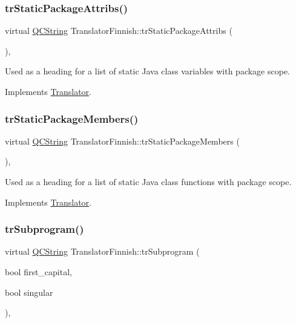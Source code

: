 \subsubsection{\texorpdfstring{trStaticPackageAttribs()}{trStaticPackageAttribs()}}
{\footnotesize\ttfamily virtual \mbox{\hyperlink{class_q_c_string}{Q\+C\+String}} Translator\+Finnish\+::tr\+Static\+Package\+Attribs (\begin{DoxyParamCaption}{ }\end{DoxyParamCaption})\hspace{0.3cm}{\ttfamily [inline]}, {\ttfamily [virtual]}}

Used as a heading for a list of static Java class variables with package scope. 

Implements \mbox{\hyperlink{class_translator}{Translator}}.

\mbox{\label{class_translator_finnish_ac1c0f0f0b111bd2fba917482182455e8}} 
\subsubsection{\texorpdfstring{trStaticPackageMembers()}{trStaticPackageMembers()}}
{\footnotesize\ttfamily virtual \mbox{\hyperlink{class_q_c_string}{Q\+C\+String}} Translator\+Finnish\+::tr\+Static\+Package\+Members (\begin{DoxyParamCaption}{ }\end{DoxyParamCaption})\hspace{0.3cm}{\ttfamily [inline]}, {\ttfamily [virtual]}}

Used as a heading for a list of static Java class functions with package scope. 

Implements \mbox{\hyperlink{class_translator}{Translator}}.

\mbox{\label{class_translator_finnish_a20f2ab991746e266355f9954382fb52b}} 
\subsubsection{\texorpdfstring{trSubprogram()}{trSubprogram()}}
{\footnotesize\ttfamily virtual \mbox{\hyperlink{class_q_c_string}{Q\+C\+String}} Translator\+Finnish\+::tr\+Subprogram (\begin{DoxyParamCaption}\item[{bool}]{first\+\_\+capital,  }\item[{bool}]{singular }\end{DoxyParamCaption})\hspace{0.3cm}{\ttfamily [inline]}, {\ttfamily [virtual]}}

